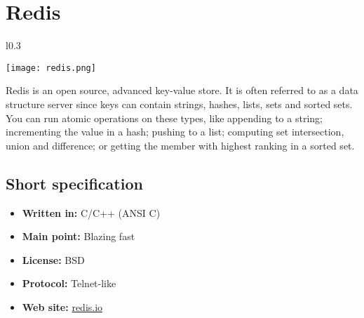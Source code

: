 \chapter{Redis}

\begin{wrapfigure}{l}{0.3\textwidth}
  \vspace{-80pt}
  \begin{center}
    \texttt{[image: redis.png]}
  \end{center}
  \vspace{-20pt}
\end{wrapfigure}
Redis is an open source, advanced key-value store. It is often referred to as a data structure server since keys can contain strings, hashes, lists, sets and sorted sets.
You can run atomic operations on these types, like appending to a string; incrementing the value in a hash; pushing to a list; computing set intersection, union and difference; or getting the member with highest ranking in a sorted set.

\section{Short specification}

\begin{itemize}
  \item \textbf{Written in:} C/C++ (ANSI C)
  \item \textbf{Main point:} Blazing fast
  \item \textbf{License:} BSD
  \item \textbf{Protocol:} Telnet-like
  \item \textbf{Web site:} \href{http://redis.io}{redis.io}
\end{itemize}